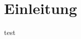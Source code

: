 \chapter{Einleitung}
\label{chap:einleitung}

\cite{hoffmann2020} test
\cite{fedorov2012slicer}
\cite{slicer2024}